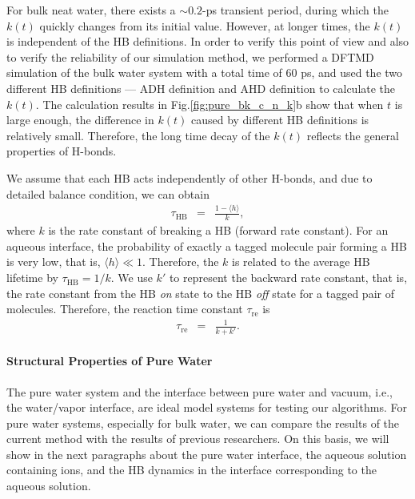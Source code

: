For bulk neat water, there exists a $\sim 0.2$-ps transient period,
during which the $k(t)$ quickly changes from its initial value. \cite{FWS00}
However, at longer times, the $k(t)$ is independent of the HB definitions.
In order to verify this point of view and also to verify the reliability of our simulation method, 
we performed a DFTMD simulation of the bulk water system with a total time of 60 ps, 
and used the two different HB definitions --- ADH definition and AHD definition to calculate the $k(t)$. 
The calculation results in Fig.\thinspace\ref{fig:pure_bk_c_n_k}b show that when $t$ is large enough, 
the difference in $k(t)$ caused by different HB definitions is relatively small.
Therefore, the long time decay of the $k(t)$ reflects the general properties of H-bonds.

We assume that each HB acts independently of other H-bonds, \cite{AL96,AL00} 
and due to detailed balance condition, we can obtain 
\begin{eqnarray}
  \tau_{\text{HB}} &=& \frac{1- \langle h\rangle}{k},
\label{eq:rate}
\end{eqnarray}
where $k$ is the rate constant of breaking a HB (forward rate constant). \cite{Chandler1986,Chandler1978} 
For an aqueous interface, the probability of exactly a tagged molecule pair forming a HB is very low, that is, $\langle h\rangle \ll 1$. Therefore,
the $k$ is related to the average HB lifetime by $\tau_{\text{HB}}=1/k$.
We use $k'$ to represent the backward rate constant, that is, the rate constant from the HB \emph{on} state to the HB \emph{off} state for a tagged pair of molecules.
Therefore, the reaction time constant $\tau_\text{re}$ is 
\begin{eqnarray}
  \tau_\text{re} &=& \frac{1}{k+k'}.
\label{eq:reaction_rate_tau}
\end{eqnarray}
%

\paragraph{Structural Properties of Pure Water}
The pure water system and the interface between pure water and vacuum, i.e., the water/vapor interface, 
are ideal model systems for testing our algorithms.
For pure water systems, especially for bulk water, we can compare the results of the current method with the results of 
previous researchers.\cite{AL96,Kessler2015} On this basis, we will show in the next paragraphs about the pure water interface, 
the aqueous solution containing ions, and the HB dynamics in the interface corresponding to the aqueous solution.

